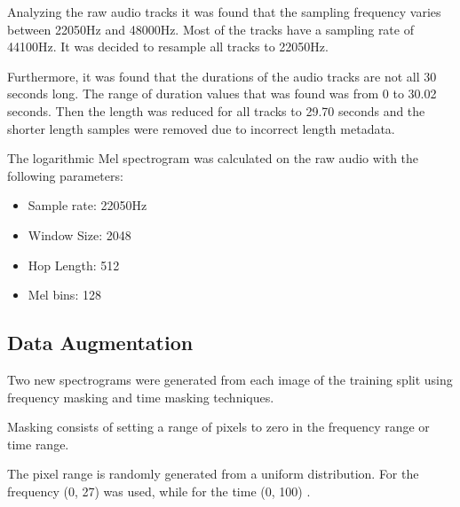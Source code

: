 Analyzing the raw audio tracks it was found that the sampling frequency varies between 22050Hz and 48000Hz.
Most of the tracks have a sampling rate of 44100Hz.
It was decided to resample all tracks to 22050Hz.

Furthermore, it was found that the durations of the audio tracks are not all 30 seconds long.
The range of duration values that was found was from 0 to 30.02 seconds.
Then the length was reduced for all tracks to 29.70 seconds and the shorter length samples were removed due to incorrect length metadata\footnotemark{}.


The logarithmic Mel spectrogram was calculated on the raw audio with the following parameters:
\begin{itemize}
  \item Sample rate: 22050Hz
  \item Window Size: 2048
  \item Hop Length: 512
  \item Mel bins: 128
\end{itemize}

\subsection{Data Augmentation}
Two new spectrograms were generated from each image of the training split using frequency masking and time masking techniques.

Masking consists of setting a range of pixels to zero in the frequency range or time range.

The pixel range is randomly generated from a uniform distribution. For the frequency (0, 27) was used, while for the time (0, 100) \cite{park2019specaugment}.

\newpage
